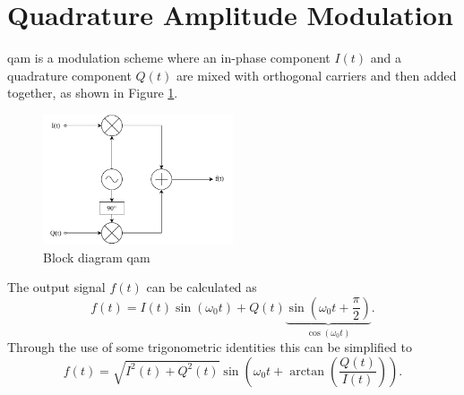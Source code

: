 \section{Quadrature Amplitude Modulation}\label{2_QAM_sec:QAM}
\acrfull{qam} \cite{nat_skript} is a modulation scheme where an in-phase component $I(t)$ and a quadrature component $Q(t)$ are mixed with orthogonal carriers and then added together, as shown in Figure \ref{2_fig:qam_diagram}. 
\begin{figure}[h!]
    \centering
    \includegraphics[width=0.5\textwidth]{images/2_Preliminaries/QAM.pdf}
    \caption{Block diagram \acrshort{qam}}
    \label{2_fig:qam_diagram}
\end{figure}

The output signal $f(t)$ can be calculated as 
\begin{equation}
    f(t) = I(t) \sin \left ( \omega_0 t\right ) + Q(t)\underbrace{\sin \left ( \omega_0 t + \frac{\pi}{2} \right)}_{\cos{(\omega_0 t)}}.
\end{equation}
Through the use of some trigonometric identities this can be simplified to 
\begin{equation}
    f(t) = \sqrt{I^2(t) + Q^2(t)} \sin{\left(\omega_0 t + \arctan{ \left ( \frac{Q(t)}{I(t)} \right )} \right )}.
\end{equation}
